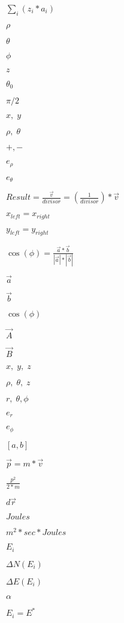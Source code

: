 \documentclass{article}
\begin{document}
$ \sum_{i} (z_{i}*a_{i}) $
\pagebreak

$ \rho $
\pagebreak

$ \theta $
\pagebreak

$ \phi $
\pagebreak

$ z $
\pagebreak

$ \theta_{0} $
\pagebreak

$ \pi/2 $
\pagebreak

$x,\; y$
\pagebreak

$ \rho,\; \theta$
\pagebreak

$ +, - $
\pagebreak

$ e_{\rho} $
\pagebreak

$ e_{\theta} $
\pagebreak

$ Result = \frac{\vec{v}}{divisor} = \left(\frac{1}{divisor}\right) * \vec{v} $
\pagebreak

$ x_{left} = x_{right} $
\pagebreak

$ y_{left} = y_{right} $
\pagebreak

$ \cos( \phi ) = \frac{ \vec{a} * \vec{b} }{ | \vec{a} | * | \vec{b} | } $
\pagebreak

$ \vec{a} $
\pagebreak

$ \vec{b} $
\pagebreak

$ \cos( \phi )$
\pagebreak

$ \vec{A} $
\pagebreak

$ \vec{B} $
\pagebreak

$x,\; y, \; z$
\pagebreak

$ \rho,\; \theta, \; z$
\pagebreak

$ r,\; \theta, \phi $
\pagebreak

$ e_{r} $
\pagebreak

$ e_{\phi} $
\pagebreak

$ [a,b] $
\pagebreak

$ \vec{p} = m*\vec{v} $
\pagebreak

$ \frac{p^{2}}{2*m} $
\pagebreak

$ d\vec{r} $
\pagebreak

$ Joules $
\pagebreak

$ m^{2}*sec*Joules $
\pagebreak

$ E_{i} $
\pagebreak

$ \Delta N(E_{i}) $
\pagebreak

$ \Delta E(E_{i}) $
\pagebreak

$ \alpha $
\pagebreak

$ E_{i}=E^{*} $
\pagebreak
\end{document}

